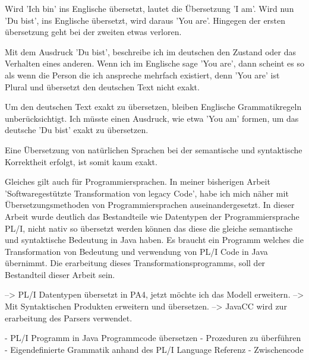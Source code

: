 Wird 'Ich bin' ins Englische übersetzt, lautet die Übersetzung 'I am'. Wird nun 'Du bist', ins Englische übersetzt, wird daraus 'You are'. Hingegen der ersten übersetzung geht bei der zweiten etwas verloren. 

Mit dem Ausdruck 'Du bist', beschreibe ich im deutschen den Zustand oder das Verhalten eines anderen. Wenn ich im Englische sage 'You are', dann scheint es so als wenn die Person die ich anspreche mehrfach existiert, denn 'You are' ist Plural und übersetzt den deutschen Text nicht exakt. 

Um den deutschen Text exakt zu übersetzen, bleiben Englische Grammatikregeln unberücksichtigt. Ich müsste einen Ausdruck, wie etwa 'You am' formen, um das deutsche 'Du bist' exakt zu übersetzen. 

Eine Übersetzung von natürlichen Sprachen bei der semantische und syntaktische Korrektheit erfolgt, ist somit kaum exakt.

Gleiches gilt auch für Programmiersprachen. In meiner bisherigen Arbeit 'Softwaregestützte Transformation von legacy Code', habe ich mich näher mit Übersetzungsmethoden von Programmiersprachen auseinandergesetzt. In dieser Arbeit wurde deutlich das Bestandteile wie Datentypen der Programmiersprache PL/I, nicht nativ so übersetzt werden können das diese die gleiche semantische und syntaktische Bedeutung in Java haben. Es braucht ein Programm welches die Transformation von Bedeutung und verwendung von PL/I Code in Java übernimmt. Die erarbeitung dieses Transformationsprogramms, soll der Bestandteil dieser Arbeit sein.

--> PL/I Datentypen übersetzt in PA4, jetzt möchte ich das Modell erweitern. 
--> Mit Syntaktischen Produkten erweitern und übersetzen.
--> JavaCC wird zur erarbeitung des Parsers verwendet.

- PL/I Programm in Java Programmcode übersetzen
- Prozeduren zu überführen
- Eigendefinierte Grammatik anhand des PL/I Language Referenz
- Zwischencode 
